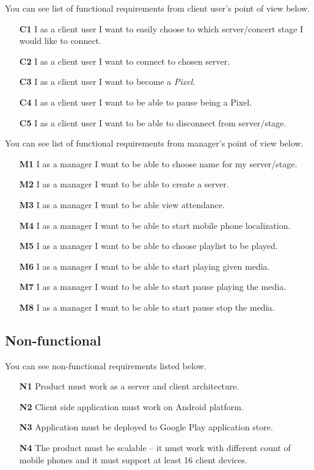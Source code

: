 You can see list of functional requirements from client user's point of view below.
\begin{enumerate}
	\item[\textbf{C1}] \label{req_C1}
		I as a client user I want to easily choose to which server/concert stage I would like to connect.
	\item[\textbf{C2}] \label{req_C2}
		I as a client user I want to connect to chosen server.
	\item[\textbf{C3}] \label{req_C3}
		I as a client user I want to become a \emph{Pixel}.
	\item[\textbf{C4}] \label{req_C4}
		I as a client user I want to be able to pause being a Pixel.
	\item[\textbf{C5}] \label{req_C5}
		I as a client user I want to be able to disconnect from server/stage.
\end{enumerate}


You can see list of functional requirements from manager's point of view below.
\begin{enumerate}
	\item[\textbf{M1}] \label{req_M1}
		I as a manager I want to be able to choose name for my server/stage.
	\item[\textbf{M2}] \label{req_M2}
		I as a manager I want to be able to create a server.
	\item[\textbf{M3}] \label{req_M3}
		I as a manager I want to be able view attendance.
	\item[\textbf{M4}] \label{req_M4}
		I as a manager I want to be able to start mobile phone localization.
	\item[\textbf{M5}] \label{req_M5}
		I as a manager I want to be able to choose playlist to be played.
	\item[\textbf{M6}] \label{req_M6}
		I as a manager I want to be able to start playing given media.
	\item[\textbf{M7}] \label{req_M7}
		I as a manager I want to be able to start pause playing the media.
	\item[\textbf{M8}] \label{req_M8}
		I as a manager I want to be able to start pause stop the media.
\end{enumerate}

\subsection{Non-functional}
You can see non-functional requirements listed below.

\begin{enumerate}
\item[\textbf{N1}] \label{req_N1} Product must work as a server and client architecture.
\item[\textbf{N2}] \label{req_N2} Client side application must work on Android platform.
\item[\textbf{N3}] \label{req_N3} Application must be deployed to Google Play application store.
\item[\textbf{N4}] \label{req_N4} The product must be scalable -- it must work with  different count of mobile phones and it must support at least 16 client devices.
\end{enumerate}

